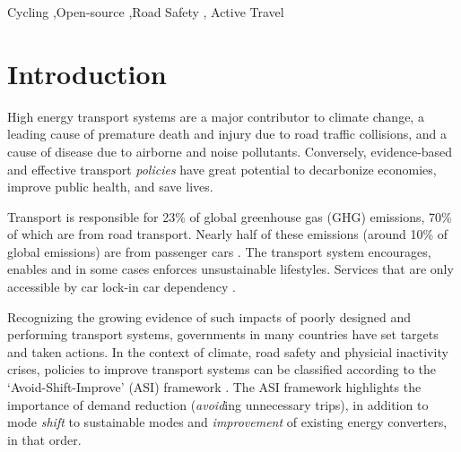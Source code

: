 \documentclass[
  super,
  preprint,
  3p]{elsarticle}
\begin{document}
\begin{frontmatter}
\begin{keyword}
    Cycling \sep Open-source \sep Road Safety \sep 
    Active Travel
\end{keyword}
\end{frontmatter}
    \ifdefined\Shaded\renewenvironment{Shaded}{\begin{tcolorbox}[interior hidden, enhanced, borderline west={3pt}{0pt}{shadecolor}, frame hidden, breakable, sharp corners, boxrule=0pt]}{\end{tcolorbox}}\fi

\newpage{}

\hypertarget{introduction}{%
\section{Introduction}\label{introduction}}

High energy transport systems are a major contributor to climate change,
a leading cause of premature death and injury due to road traffic
collisions, and a cause of disease due to airborne and noise pollutants.
Conversely, evidence-based and effective transport \emph{policies} have
great potential to decarbonize economies, improve public health, and
save lives.

Transport is responsible for 23\% of global greenhouse gas (GHG)
emissions, 70\% of which are from road transport. Nearly half of these
emissions (around 10\% of global emissions) are from passenger cars
\citep{jaramillo2022}. The transport system encourages, enables and in
some cases enforces unsustainable lifestyles. Services that are only
accessible by car lock-in car dependency
\citep{gray2001, shergold2012, motte-baumvol2010}.

Recognizing the growing evidence of such impacts of poorly designed and
performing transport systems, governments in many countries have set
targets and taken actions. In the context of climate, road safety and
physicial inactivity crises, policies to improve transport systems can
be classified according to the `Avoid-Shift-Improve' (ASI) framework
\citep{jaramillo2022}. The ASI framework highlights the importance of
demand reduction (\emph{avoid}ing unnecessary trips), in addition to
mode \emph{shift} to sustainable modes and \emph{improvement} of
existing energy converters, in that order.
\end{document}
